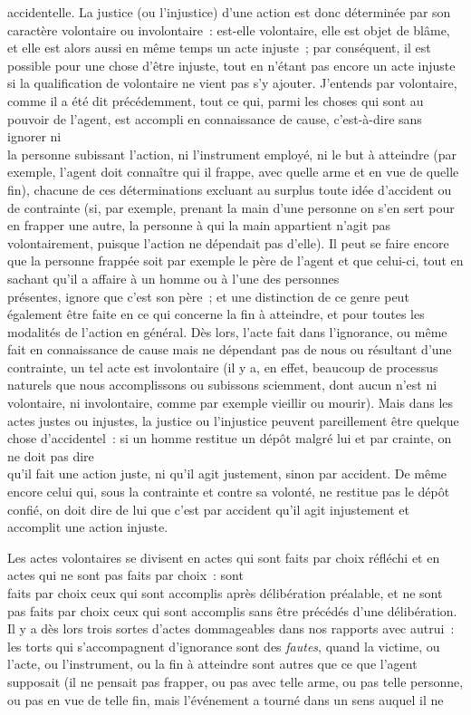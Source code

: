 \documentclass[french,twoside]{book} %
\begin{document}
accidentelle. La justice (ou l’injustice) d’une action est donc déterminée par son caractère volontaire ou involontaire : est-elle volontaire, elle est objet de blâme, et elle est alors aussi en même temps un acte injuste ; par conséquent, il est possible pour une chose d’être injuste, tout en n’étant pas encore un acte injuste si la qualification de volontaire ne vient pas s’y ajouter. J’entends par volontaire, comme il a été dit précédemment, tout ce qui, parmi les choses qui sont au pouvoir de l’agent, est accompli en connaissance de cause, c’est-à-dire sans ignorer ni \\
la personne subissant l’action, ni l’instrument employé, ni le but à atteindre (par exemple, l’agent doit connaître qui il frappe, avec quelle arme et en vue de quelle fin), chacune de ces déterminations excluant au surplus toute idée d’accident ou de contrainte (si, par exemple, prenant la main d’une personne on s’en sert pour en frapper une autre, la personne à qui la main appartient n’agit pas volontairement, puisque l’action ne dépendait pas d’elle). Il peut se faire encore que la personne frappée soit par exemple le père de l’agent et que celui-ci, tout en sachant qu’il a affaire à un homme ou à l’une des personnes \\
présentes, ignore que c’est son père ; et une distinction de ce genre peut également être faite en ce qui concerne la fin à atteindre, et pour toutes les modalités de l’action en général. Dès lors, l’acte fait dans l’ignorance, ou même fait en connaissance de cause mais ne dépendant pas de nous ou résultant d’une contrainte, un tel acte est involontaire (il y a, en effet, beaucoup de processus naturels que nous accomplissons ou  subissons sciemment, dont aucun n’est ni volontaire, ni involontaire, comme par exemple vieillir ou mourir). Mais dans les actes justes ou injustes, la justice ou l’injustice peuvent pareillement être quelque chose d’accidentel : si un homme restitue un dépôt malgré lui et par crainte, on ne doit pas dire \\
qu’il fait une action juste, ni qu’il agit justement, sinon par accident. De même encore celui qui, sous la contrainte et contre sa volonté, ne restitue pas le dépôt confié, on doit dire de lui que c’est par accident qu’il agit injustement et accomplit une action injuste.\par
Les actes volontaires se divisent en actes qui sont faits par choix réfléchi et en actes qui ne sont pas faits par choix : sont \\
faits par choix ceux qui sont accomplis après délibération préalable, et ne sont pas faits par choix ceux qui sont accomplis sans être précédés d’une délibération. Il y a dès lors trois sortes d’actes dommageables dans nos rapports avec autrui : les torts qui s’accompagnent d’ignorance sont des {\itshape fautes}, quand la victime, ou l’acte, ou l’instrument, ou la fin à atteindre sont autres que ce que l’agent supposait (il ne pensait pas frapper, ou pas avec telle arme, ou pas telle personne, ou pas en vue de telle fin, mais l’événement a tourné dans un sens auquel il ne \\
\end{document}
